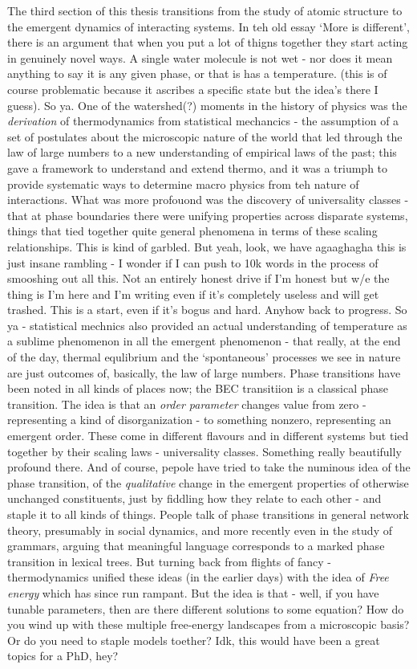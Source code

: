 The third section of this thesis transitions from the study of atomic
structure to the emergent dynamics of interacting systems. In teh old
essay `More is different', there is an argument that when you put a lot
of thigns together they start acting in genuinely novel ways. A single
water molecule is not wet - nor does it mean anything to say it is any
given phase, or that is has a temperature. (this is of course
problematic because it ascribes a specific state but the idea's there I
guess). So ya. One of the watershed(?) moments in the history of physics
was the \emph{derivation} of thermodynamics from statistical mechancics
- the assumption of a set of postulates about the microscopic nature of
the world that led through the law of large numbers to a new
understanding of empirical laws of the past; this gave a framework to
understand and extend thermo, and it was a triumph to provide systematic
ways to determine macro physics from teh nature of interactions. What
was more profouond was the discovery of universality classes - that at
phase boundaries there were unifying properties across disparate
systems, things that tied together quite general phenomena in terms of
these scaling relationships. This is kind of garbled. But yeah, look, we
have agaaghagha this is just insane rambling - I wonder if I can push to
10k words in the process of smooshing out all this. Not an entirely
honest drive if I'm honest but w/e the thing is I'm here and I'm writing
even if it's completely useless and will get trashed. This is a start,
even if it's bogus and hard. Anyhow back to progress. So ya -
statistical mechnics also provided an actual understanding of
temperature as a sublime phenomenon in all the emergent phenomenon -
that really, at the end of the day, thermal equlibrium and the
`spontaneous' processes we see in nature are just outcomes of,
basically, the law of large numbers. Phase transitions have been noted
in all kinds of places now; the BEC transitiion is a classical phase
transition. The idea is that an \emph{order parameter} changes value
from zero - representing a kind of disorganization - to something
nonzero, representing an emergent order. These come in different
flavours and in different systems but tied together by their scaling
laws - universality classes. Something really beautifully profound
there. And of course, pepole have tried to take the numinous idea of the
phase transition, of the \emph{qualitative} change in the emergent
properties of otherwise unchanged constituents, just by fiddling how
they relate to each other - and staple it to all kinds of things. People
talk of phase transitions in general network theory, presumably in
social dynamics, and more recently even in the study of grammars,
arguing that meaningful language corresponds to a marked phase
transition in lexical trees. But turning back from flights of fancy -
thermodynamics unified these ideas (in the earlier days) with the idea
of \emph{Free energy} which has since run rampant. But the idea is that
- well, if you have tunable parameters, then are there different
solutions to some equation? How do you wind up with these multiple
free-energy landscapes from a microscopic basis? Or do you need to
staple models toether? Idk, this would have been a great topics for a
PhD, hey?

